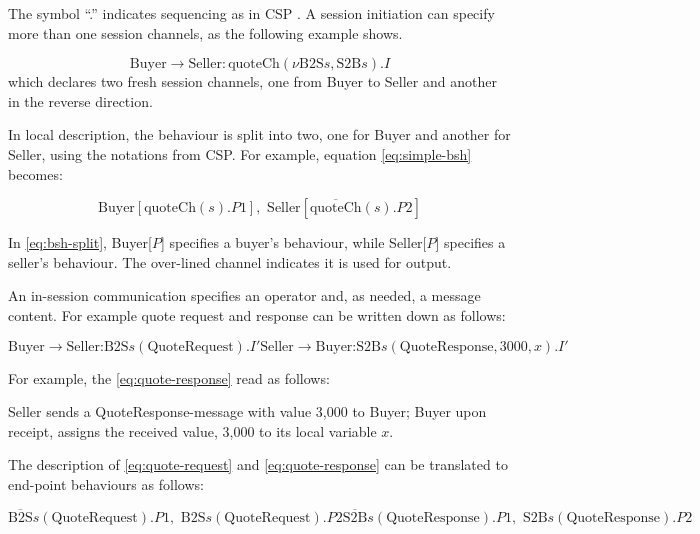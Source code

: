  The symbol ``.'' indicates sequencing as in CSP \cite{com-seq-proc}. A session initiation can specify more than one session channels, as the following example shows.

\begin{equation}
\text{Buyer} \rightarrow \text{Seller} : \text{quoteCh}(\nu \text{B2S}s, \text{S2B}s).I
\end{equation}
which declares two fresh session channels, one from Buyer to Seller and another in the reverse direction.

In local description, the behaviour is split into two, one for Buyer and another for Seller, using the notations from CSP. For example, equation \ref{eq:simple-bsh} becomes:

\begin{equation} 
\text{Buyer}[\text{quoteCh}(s).P1], \text{ Seller}[\overline{\text{quoteCh}}(s).P2]
\label{eq:bsh-split}
\end{equation}

 In \ref{eq:bsh-split},  Buyer[$P$] specifies a buyer's behaviour, while Seller[$P$] specifies a seller's behaviour. The over-lined channel indicates it is used for output.

An in-session communication specifies an operator and, as needed, a message content. For example quote request and response can be written down as follows:

\begin{subequations}
\begin{equation}
\text{Buyer} \rightarrow \text{Seller:B2S}s(\text{QuoteRequest}).I'
\label{eq:quote-request}
\end{equation}
\begin{equation}
\text{Seller} \rightarrow \text{Buyer:S2B}s(\text{QuoteResponse}, 3000, x).I'
\label{eq:quote-response}
\end{equation}
\end{subequations}

For example, the \ref{eq:quote-response} read as follows:

Seller sends a QuoteResponse-message with value 3,000 to Buyer; Buyer upon receipt, assigns the received value, 3,000 to its local variable $x$.

The description of \ref{eq:quote-request} and \ref{eq:quote-response} can be translated to end-point behaviours as follows:

\begin{subequations}
\begin{equation}
\overline{\text{B2S}}s(\text{QuoteRequest}).P1, \text{ B2S}s(\text{QuoteRequest}).P2
\label{eq:end-point-request}
\end{equation}
\begin{equation}
\overline{\text{S2B}}s(\text{QuoteResponse}).P1, \text{ S2B}s(\text{QuoteResponse}).P2
\label{eq:end-point-response}
\end{equation}
\end{subequations}

